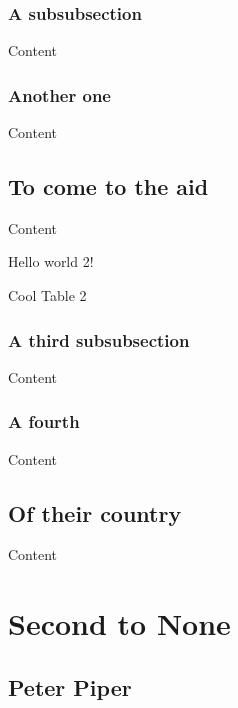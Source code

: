 \documentclass{book}
\newcommand{\insMinitoc}[2][]{%
    \begin{center}#2
    \begin{minipage}[c]{0.8\linewidth}
    \insertminitoc[#1]
    \end{minipage}
    \end{center}
}
\begin{document}
\subsubsection{A subsubsection}

Content

\subsubsection{Another one}

Content

\subsection{To come to the aid}

Content

\begin{table}[htb]
\begin{center}
Hello world 2!
\end{center}
\caption{Cool Table 2}
\end{table}

\subsubsection{A third subsubsection}

Content

\subsubsection{A fourth}

Content

\subsection{Of their country}

Content


\newpage

\section{Second to None}


\insMinitoc{\small\minitocFmti}

\subsection{Peter Piper}
\end{document}
